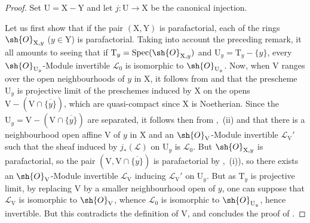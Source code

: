 \begin{proof}
Set $\mathrm{U}=\mathrm{X}-\mathrm{Y}$ and let $j:\mathrm{U}\to\mathrm{X}$ be the canonical injection.

Let us first show that if the pair $(\mathrm{X},\mathrm{Y})$ is parafactorial, each of the rings $\sh{O}_{\mathrm{X},y}$ ($y\in\mathrm{Y}$) is parafactorial.
Taking into account the preceding remark, it all amounts to seeing that if $\mathrm{T}_y=\operatorname{Spec}(\sh{O}_{\mathrm{X},y})$ and $\mathrm{U}_y=\mathrm{T}_y-\{y\}$, every $\sh{O}_{\mathrm{U}_y}$-Module invertible $\mathscr{L}_0$ is isomorphic to $\sh{O}_{\mathrm{U}_y}$.
Now, when $\mathrm{V}$ ranges over the open neighbourhoods of $y$ in $\mathrm{X}$, it follows from  and  that the prescheme $\mathrm{U}_y$ is projective limit of the preschemes induced by $\mathrm{X}$ on the opens $\mathrm{V}-(\mathrm{V}\cap\overline{\{y\}})$, which are quasi-compact since $\mathrm{X}$ is Noetherian.
Since the $\mathrm{U}_y=\mathrm{V}-(\mathrm{V}\cap\overline{\{y\}})$ are separated, it follows then from ,~(ii) and  that there is a neighbourhood open affine $\mathrm{V}$ of $y$ in $\mathrm{X}$ and an $\sh{O}_{\mathrm{V}}$-Module invertible $\mathscr{L}_{\mathrm{V}}'$ such that the sheaf induced by $j_*(\mathscr{L})$ on $\mathrm{U}_y$ is $\mathscr{L}_0$.
But $\sh{O}_{\mathrm{X},y}$ is parafactorial, so the pair $(\mathrm{V},\mathrm{V}\cap\overline{\{y\}})$ is parafactorial by ,~(i)), so there exists an $\sh{O}_{\mathrm{V}}$-Module invertible $\mathscr{L}_{\mathrm{V}}$ inducing $\mathscr{L}_{\mathrm{V}}'$ on $\mathrm{U}_y$.
But as $\mathrm{T}_y$ is projective limit, by replacing $\mathrm{V}$ by a smaller neighbourhood open of $y$, one can suppose that $\mathscr{L}_{\mathrm{V}}$ is isomorphic to $\sh{O}_{\mathrm{V}}$, whence $\mathscr{L}_0$ is isomorphic to $\sh{O}_{\mathrm{U}_y}$, hence invertible.
But this contradicts the definition of $\mathrm{V}$, and concludes the proof of .


\end{proof}

